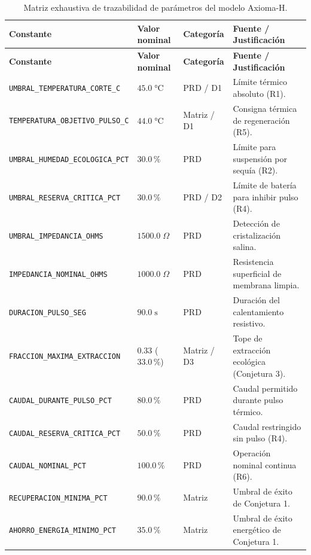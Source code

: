 {\footnotesize
\begin{longtable}{@{}L{4.7cm}L{2.7cm}L{2.0cm}L{5.3cm}@{}}
\caption{Matriz exhaustiva de trazabilidad de par\'ametros del modelo Axioma-H.}
\label{tab:anexo_trazabilidad} \\
\toprule
\textbf{Constante} & \textbf{Valor nominal} & \textbf{Categor\'ia} & \textbf{Fuente / Justificaci\'on} \\
\midrule
\endfirsthead
\toprule
\textbf{Constante} & \textbf{Valor nominal} & \textbf{Categor\'ia} & \textbf{Fuente / Justificaci\'on} \\
\midrule
\endhead
\bottomrule
\endfoot
\texttt{UMBRAL\_TEMPERATURA\_\allowbreak CORTE\_C} & $45.0\;\si{\celsius}$ & PRD / D1 & L\'imite t\'ermico absoluto (R1). \\
\texttt{TEMPERATURA\_OBJETIVO\_\allowbreak PULSO\_C} & $44.0\;\si{\celsius}$ & Matriz / D1 & Consigna t\'ermica de regeneraci\'on (R5). \\
\texttt{UMBRAL\_HUMEDAD\_\allowbreak ECOLOGICA\_PCT} & $30.0\,\%$ & PRD & L\'imite para suspensi\'on por sequ\'ia (R2). \\
\texttt{UMBRAL\_RESERVA\_\allowbreak CRITICA\_PCT} & $30.0\,\%$ & PRD / D2 & L\'imite de bater\'ia para inhibir pulso (R4). \\
\texttt{UMBRAL\_IMPEDANCIA\_\allowbreak OHMS} & $1500.0\;\Omega$ & PRD & Detecci\'on de cristalizaci\'on salina. \\
\texttt{IMPEDANCIA\_NOMINAL\_\allowbreak OHMS} & $1000.0\;\Omega$ & PRD & Resistencia superficial de membrana limpia. \\
\texttt{DURACION\_PULSO\_SEG} & $90.0\;\text{s}$ & PRD & Duraci\'on del calentamiento resistivo. \\
\texttt{FRACCION\_MAXIMA\_\allowbreak EXTRACCION} & $0.33$ ($33.0\,\%$) & Matriz / D3 & Tope de extracci\'on ecol\'ogica (Conjetura 3). \\
\texttt{CAUDAL\_DURANTE\_\allowbreak PULSO\_PCT} & $80.0\,\%$ & PRD & Caudal permitido durante pulso t\'ermico. \\
\texttt{CAUDAL\_RESERVA\_\allowbreak CRITICA\_PCT} & $50.0\,\%$ & PRD & Caudal restringido sin pulso (R4). \\
\texttt{CAUDAL\_NOMINAL\_PCT} & $100.0\,\%$ & PRD & Operaci\'on nominal continua (R6). \\
\texttt{RECUPERACION\_\allowbreak MINIMA\_PCT} & $90.0\,\%$ & Matriz & Umbral de \'exito de Conjetura 1. \\
\texttt{AHORRO\_ENERGIA\_\allowbreak MINIMO\_PCT} & $35.0\,\%$ & Matriz & Umbral de \'exito energ\'etico de Conjetura 1. \\

\end{longtable}}
